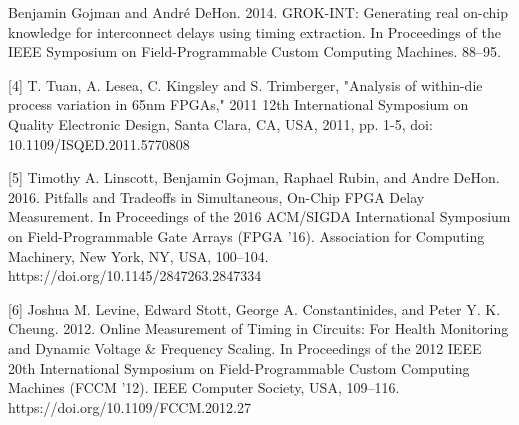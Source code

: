 \documentclass[11pt]{report}
\begin{document}
\begin{mainf}
[3] Benjamin Gojman and André DeHon. 2014. GROK-INT: Generating real on-chip knowledge for interconnect delays
using timing extraction. In Proceedings of the IEEE Symposium on Field-Programmable Custom Computing Machines.
88–95.

[4] T. Tuan, A. Lesea, C. Kingsley and S. Trimberger, "Analysis of within-die process variation in 65nm FPGAs," 2011 12th International Symposium on Quality Electronic Design, Santa Clara, CA, USA, 2011, pp. 1-5, doi: 10.1109/ISQED.2011.5770808

[5] Timothy A. Linscott, Benjamin Gojman, Raphael Rubin, and Andre DeHon. 2016. Pitfalls and Tradeoffs in Simultaneous, On-Chip FPGA Delay Measurement. In Proceedings of the 2016 ACM/SIGDA International Symposium on Field-Programmable Gate Arrays (FPGA '16). Association for Computing Machinery, New York, NY, USA, 100–104. https://doi.org/10.1145/2847263.2847334

[6] Joshua M. Levine, Edward Stott, George A. Constantinides, and Peter Y. K. Cheung. 2012. Online Measurement of Timing in Circuits: For Health Monitoring and Dynamic Voltage \& Frequency Scaling. In Proceedings of the 2012 IEEE 20th International Symposium on Field-Programmable Custom Computing Machines (FCCM '12). IEEE Computer Society, USA, 109–116. https://doi.org/10.1109/FCCM.2012.27 

\end{mainf}    
\end{document}
